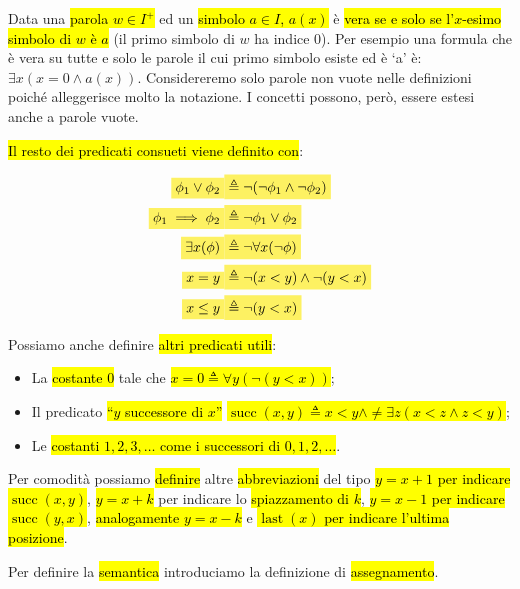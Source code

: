 \documentclass[a4paper,11pt,oneside]{article}
\theoremstyle{plain}
\theoremstyle{definition}
\theoremstyle{remark}
\newcommand{\mhl}[1]{\colorbox{hlcolor}{$\displaystyle #1$}}
\DeclareMathOperator{\succc}{succ}
\DeclareMathOperator{\last}{last}
\begin{document}
Data una \hl{parola $w \in I^+$} ed un \hl{simbolo $a\in I$, $a(x)$} è \hl{vera
se e solo se l'$x$-esimo simbolo di $w$ è $a$} (il primo simbolo di $w$ ha
indice 0). Per esempio una formula che è vera su tutte e solo le parole il cui
primo simbolo esiste ed è `a' è: $\exists x(x = 0 \land a(x))$. Considereremo
solo parole non vuote nelle definizioni poiché alleggerisce molto la notazione.
I concetti possono, però, essere estesi anche a parole vuote.

\hl{Il resto dei predicati consueti viene definito con}:

\begin{align}
  \mhl{\phi_1 \lor \phi_2}     & \mhl{\triangleq \neg(\neg\phi_1\land\neg\phi_2)} \\
  \mhl{\phi_1 \implies \phi_2} & \mhl{\triangleq \neg\phi_1\lor\phi_2} \\
  \mhl{\exists x(\phi)}        & \mhl{\triangleq \neg \forall x(\neg\phi)} \\
  \mhl{x = y}                  & \mhl{\triangleq \neg(x<y) \land \neg(y<x)} \\
  \mhl{x \leq y}               & \mhl{\triangleq \neg(y<x)}
\end{align}

Possiamo anche definire \hl{altri predicati utili}:

\begin{itemize}
  \item La \hl{costante $0$} tale che \hl{$x = 0 \triangleq \forall
    y(\neg(y<x))$};
  \item Il predicato \hl{``$y$ successore di  $x$''}
    \hl{$\succc(x,y) \triangleq x<y \land \neq\exists z(x<z \land z<y)$};
  \item Le \hl{costanti $1,2,3,\ldots$ come i successori di $0,1,2,\ldots$}.
\end{itemize}

Per comodità possiamo \hl{definire} altre \hl{abbreviazioni} del tipo
\hl{$y=x+1$ per indicare $\succc(x,y)$}, \hl{$y=x+k$} per indicare lo
\hl{spiazzamento di $k$}, \hl{$y=x-1$ per indicare $\succc(y,x)$},
\hl{analogamente $y=x-k$} e \hl{$\last(x)$ per indicare l'ultima posizione}.

Per definire la \hl{semantica} introduciamo la definizione di \hl{assegnamento}.
\end{document}
